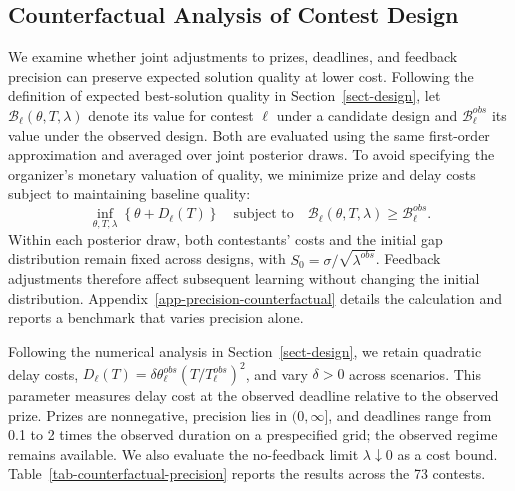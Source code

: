 \subsection{Counterfactual Analysis of Contest Design}\label{sect-precision-design}

We examine whether joint adjustments to prizes, deadlines, and feedback precision can preserve expected solution quality at lower cost. Following the definition of expected best-solution quality in Section~\ref{sect-design}, let $\mathcal B_\ell(\theta,T,\lambda)$ denote its value for contest $\ell$ under a candidate design and $\mathcal B_\ell^{obs}$ its value under the observed design. Both are evaluated using the same first-order approximation and averaged over joint posterior draws. To avoid specifying the organizer's monetary valuation of quality, we minimize prize and delay costs subject to maintaining baseline quality:
\begin{equation}\label{eq-empirical-joint-design}
\inf_{\theta,T,\lambda}\left\{\theta+D_\ell(T)\right\}
\quad\text{subject to}\quad
\mathcal B_\ell(\theta,T,\lambda)\geq \mathcal B_\ell^{obs}.
\end{equation}
Within each posterior draw, both contestants' costs and the initial gap distribution remain fixed across designs, with $S_0=\sigma/\sqrt{\lambda^{obs}}$. Feedback adjustments therefore affect subsequent learning without changing the initial distribution. Appendix~\ref{app-precision-counterfactual} details the calculation and reports a benchmark that varies precision alone.

Following the numerical analysis in Section~\ref{sect-design}, we retain quadratic delay costs, $D_\ell(T)=\delta\theta_\ell^{obs}(T/T_\ell^{obs})^2$, and vary $\delta>0$ across scenarios. This parameter measures delay cost at the observed deadline relative to the observed prize. Prizes are nonnegative, precision lies in $(0,\infty]$, and deadlines range from 0.1 to 2 times the observed duration on a prespecified grid; the observed regime remains available. We also evaluate the no-feedback limit $\lambda\downarrow0$ as a cost bound. Table~\ref{tab-counterfactual-precision} reports the results across the 73 contests.

